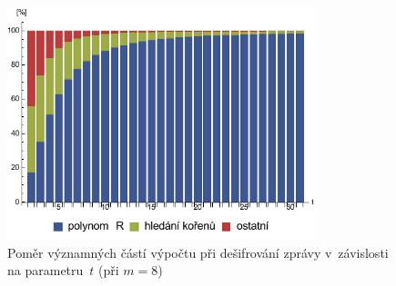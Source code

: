\documentclass[thesis=M,czech,hidelinks]{FITthesis}[2012/06/26]
\newcommand{\0}{{\textcolor[gray]{0.75}{0}}}
\begin{document}
\begin{figure}[!ht]
    \centering
    \includegraphics[width=0.8\textwidth]{../implementace/grafy/chart_m8_desifrovani.pdf}
    \caption{
        Poměr významných částí výpočtu při dešifrování zprávy v~závislosti na
        parametru~$t$ (při $m=8$)
    }
    \label{obr_mereni_pomer_desifr}
\end{figure}
\end{document}
